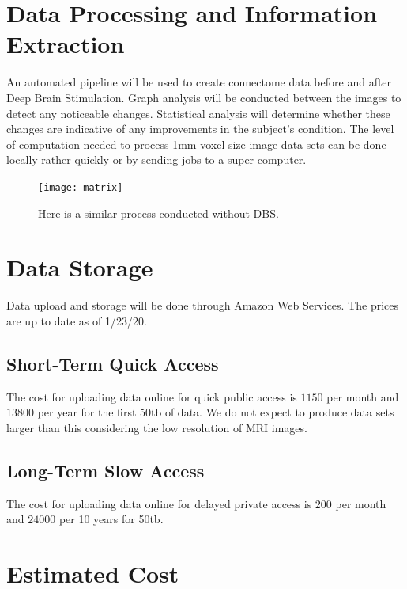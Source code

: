 \documentclass{article}
\begin{document}
\section{Data Processing and Information Extraction}
An automated pipeline will be used to create connectome data before and after Deep Brain Stimulation. \cite{Pipeline} Graph analysis will be conducted between the images to detect any noticeable changes. Statistical analysis will determine whether these changes are indicative of any improvements in the subject's condition. The level of computation needed to process 1mm voxel size image data sets can be done locally rather quickly or by sending jobs to a super computer.

\begin{figure}[h!]
\centering
\texttt{[image: matrix]}
\caption{Here is a similar process conducted without DBS. \cite{Pipeline}}
\label{fig:method}
\end{figure}
\section{Data Storage}
    Data upload and storage will be done through Amazon Web Services. The prices are up to date as of 1/23/20.
\subsection{Short-Term Quick Access}
    The cost for uploading data online for quick public access is $1150$ per month and $13800$ per year for the first 50tb of data. We do not expect to produce data sets larger than this considering the low resolution of MRI images. \cite{AWS}
\subsection{Long-Term Slow Access}
    The cost for uploading data online for delayed private access is $200$ per month and $24000$ per 10 years for 50tb. \cite{AWS}

\section{Estimated Cost}
\end{document}

